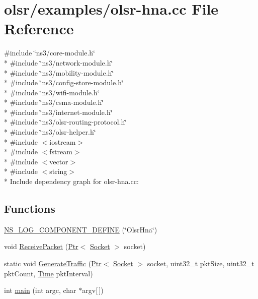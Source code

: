 \hypertarget{olsr-hna_8cc}{}\section{olsr/examples/olsr-\/hna.cc File Reference}
\label{olsr-hna_8cc}
{\ttfamily \#include \char`\"{}ns3/core-\/module.\+h\char`\"{}}\\*
{\ttfamily \#include \char`\"{}ns3/network-\/module.\+h\char`\"{}}\\*
{\ttfamily \#include \char`\"{}ns3/mobility-\/module.\+h\char`\"{}}\\*
{\ttfamily \#include \char`\"{}ns3/config-\/store-\/module.\+h\char`\"{}}\\*
{\ttfamily \#include \char`\"{}ns3/wifi-\/module.\+h\char`\"{}}\\*
{\ttfamily \#include \char`\"{}ns3/csma-\/module.\+h\char`\"{}}\\*
{\ttfamily \#include \char`\"{}ns3/internet-\/module.\+h\char`\"{}}\\*
{\ttfamily \#include \char`\"{}ns3/olsr-\/routing-\/protocol.\+h\char`\"{}}\\*
{\ttfamily \#include \char`\"{}ns3/olsr-\/helper.\+h\char`\"{}}\\*
{\ttfamily \#include $<$iostream$>$}\\*
{\ttfamily \#include $<$fstream$>$}\\*
{\ttfamily \#include $<$vector$>$}\\*
{\ttfamily \#include $<$string$>$}\\*
Include dependency graph for olsr-\/hna.cc\+:
\subsection*{Functions}
\begin{DoxyCompactItemize}
\item 
\hyperlink{olsr-hna_8cc_a903d75511f2ecbacf489f86e8322b43f}{N\+S\+\_\+\+L\+O\+G\+\_\+\+C\+O\+M\+P\+O\+N\+E\+N\+T\+\_\+\+D\+E\+F\+I\+NE} (\char`\"{}Olsr\+Hna\char`\"{})
\item 
void \hyperlink{olsr-hna_8cc_a80dc0d980be124d8d5c4ee0b7943bfae}{Receive\+Packet} (\hyperlink{classns3_1_1Ptr}{Ptr}$<$ \hyperlink{classns3_1_1Socket}{Socket} $>$ socket)
\item 
static void \hyperlink{olsr-hna_8cc_a9215c0692f5b30471001df4ee488ac6f}{Generate\+Traffic} (\hyperlink{classns3_1_1Ptr}{Ptr}$<$ \hyperlink{classns3_1_1Socket}{Socket} $>$ socket, uint32\+\_\+t pkt\+Size, uint32\+\_\+t pkt\+Count, \hyperlink{classns3_1_1Time}{Time} pkt\+Interval)
\item 
int \hyperlink{olsr-hna_8cc_a0ddf1224851353fc92bfbff6f499fa97}{main} (int argc, char $\ast$argv\mbox{[}$\,$\mbox{]})
\end{DoxyCompactItemize}


